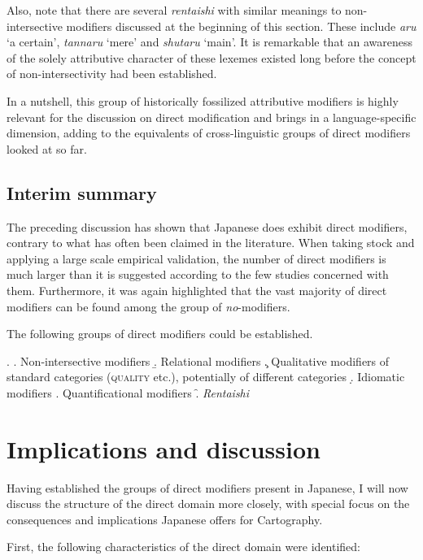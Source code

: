 Also, note that there are several \textit{rentaishi} with similar meanings to non-intersective modifiers \citep{kamp:1995:prototype, panayidou:2013:in} discussed at the beginning of this section. These include \textit{aru} `a certain’, \textit{tannaru} `mere’ and \textit{shutaru} `main’. It is remarkable that an awareness of the solely attributive character of these lexemes existed long before the concept of non-intersectivity had been established.

In a nutshell, this group of historically fossilized attributive modifiers is highly relevant for the discussion on direct modification and brings in a language-specific dimension, adding to the equivalents of cross-linguistic groups of direct modifiers looked at so far.

\subsection{Interim summary}

The preceding discussion has shown that Japanese does exhibit direct modifiers, contrary to what has often been claimed in the literature. When taking stock and applying a large scale empirical validation, the number of direct modifiers is much larger than it is suggested according to the few studies concerned with them. Furthermore, it was again highlighted that the vast majority of direct modifiers can be found among the group of \textit{no}-modifiers.

The following groups of direct modifiers could be established.

\ex. \a. Non-intersective modifiers
\b. Relational modifiers
\c. Qualitative modifiers of standard categories (\textsc{quality} etc.), potentially of different categories
\d. Idiomatic modifiers
\e. Quantificational modifiers
\f. \textit{Rentaishi}

\section{Implications and discussion} \label{discussiondirect}

Having established the groups of direct modifiers present in Japanese, I will now discuss the structure of the direct domain more closely, with special focus on the consequences and implications Japanese offers for Cartography.

First, the following characteristics of the direct domain were identified:


